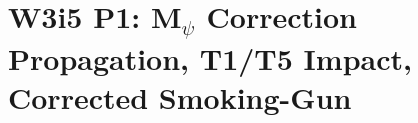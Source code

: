 %

\usepackage{amsmath,amssymb,amsfonts,amsthm,mathtools}
\usepackage{booktabs}
\usepackage{longtable}
\usepackage{array}
\usepackage{colortbl}
\usepackage{xcolor}
\usepackage{enumitem}
\usepackage{siunitx}
\usepackage{hyperref}
\usepackage{tcolorbox}

\newcommand{\dpsi}{\delta\psi}
\newcommand{\lam}{\lambda}
\newcommand{\SNR}{\mathrm{SNR}}
\newcommand{\order}[1]{\mathcal{O}(#1)}
\newcommand{\half}{\tfrac{1}{2}}
\newcommand{\ee}[1]{\times 10^{#1}}
\newcommand{\ns}{\,\mathrm{ns}}
\newcommand{\ps}{\,\mathrm{ps}}
\newcommand{\fs}{\,\mathrm{fs}}
\newcommand{\muHz}{\,\mu\mathrm{Hz}}
\newcommand{\lbone}{|\lam - 1|}
\newcommand{\Meff}{M_\psi^{\rm eff}}
\newcommand{\Mpsiused}{M_\psi^{\rm used}}
\newcommand{\psicosmo}{\bar{\psi}_{\rm cosmo}}


\newtheorem{theorem}{Theorem}[section]
\newtheorem{proposition}[theorem]{Proposition}
\newtheorem{corollary}[theorem]{Corollary}
\newtheorem{lemma}[theorem]{Lemma}
\newtheorem{definition}[theorem]{Definition}
\newtheorem{finding}[theorem]{Finding}
\newtheorem{correction}[theorem]{Correction}

\section{W3i5 P1: M$_\psi$ Correction Propagation, T1/T5 Impact, Corrected
Smoking-Gun}
\label{sec:w3i5_intro}

